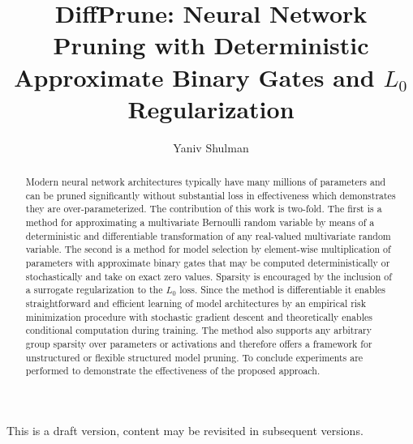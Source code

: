 \documentclass[final,1p,times]{elsarticle}
\begin{document}
\begin{frontmatter}

\vspace*{\fill}
\begin{center}
This is a draft version, content may be revisited in subsequent versions.
\end{center}
\vspace*{\fill}
    
\title{DiffPrune: Neural Network Pruning with Deterministic Approximate Binary Gates and $L_0$ Regularization}
\author{Yaniv Shulman}
\address{yaniv@aleph-zero.info}


\begin{abstract}
Modern neural network architectures typically have many millions of parameters and can be pruned significantly without substantial loss in effectiveness which demonstrates they are over-parameterized. The contribution of this work is two-fold. The first is a method for approximating a multivariate Bernoulli random variable by means of a deterministic and differentiable transformation of any real-valued multivariate random variable. The second is a method for model selection by element-wise multiplication of parameters with approximate binary gates that may be computed deterministically or stochastically and take on exact zero values. Sparsity is encouraged by the inclusion of a surrogate regularization to the $L_0$ loss. Since the method is differentiable it enables straightforward and efficient learning of model architectures by an empirical risk minimization procedure with stochastic gradient descent and theoretically enables conditional computation during training. The method also supports any arbitrary group sparsity over parameters or activations and therefore offers a framework for unstructured or flexible structured model pruning. To conclude experiments are performed to demonstrate the effectiveness of the proposed approach.

\end{abstract}
\end{frontmatter}
\end{document}
